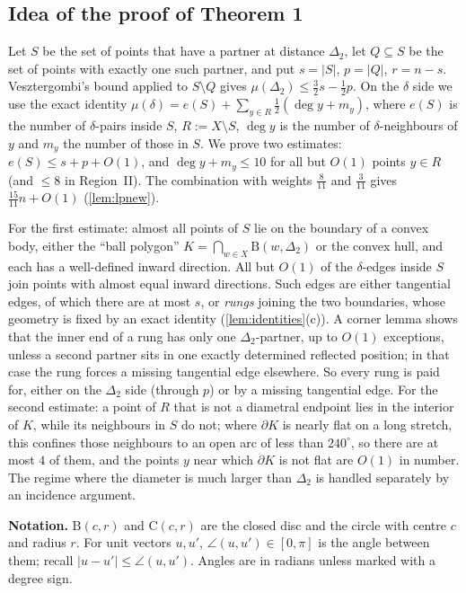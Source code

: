 \documentclass[11pt]{amsart}
\theoremstyle{definition}
\theoremstyle{remark}
\newcommand{\Dt}{\Delta_2}
\newcommand{\mult}{\mu}
\newcommand{\Cc}{\mathrm{C}}      %
\newcommand{\Dd}{\mathrm{B}}      %
\begin{document}
\subsection*{Idea of the proof of Theorem 1}
Let $S$ be the set of points that have a partner at distance $\Dt$, let $Q\subseteq S$ be the set of points with exactly one such partner, and put $s=|S|$, $p=|Q|$, $r=n-s$. Vesztergombi's bound applied to $S\setminus Q$ gives $\mult(\Dt)\le\frac32s-\frac12p$. On the $\delta$ side we use the exact identity $\mult(\delta)=e(S)+\sum_{y\in R}\frac12(\deg y+m_y)$, where $e(S)$ is the number of $\delta$-pairs inside $S$, $R:=X\setminus S$, $\deg y$ is the number of $\delta$-neighbours of $y$ and $m_y$ the number of those in $S$. We prove two estimates: $e(S)\le s+p+O(1)$, and $\deg y+m_y\le10$ for all but $O(1)$ points $y\in R$ (and $\le8$ in Region~II). The combination with weights $\frac8{11}$ and $\frac3{11}$ gives $\frac{15}{11}n+O(1)$ (\cref{lem:lpnew}).

For the first estimate: almost all points of $S$ lie on the boundary of a convex body, either the ``ball polygon'' $K=\bigcap_{w\in X}\Dd(w,\Dt)$ or the convex hull, and each has a well-defined inward direction. All but $O(1)$ of the $\delta$-edges inside $S$ join points with almost equal inward directions. Such edges are either tangential edges, of which there are at most $s$, or \emph{rungs} joining the two boundaries, whose geometry is fixed by an exact identity (\cref{lem:identities}(c)). A corner lemma shows that the inner end of a rung has only one $\Dt$-partner, up to $O(1)$ exceptions, unless a second partner sits in one exactly determined reflected position; in that case the rung forces a missing tangential edge elsewhere. So every rung is paid for, either on the $\Dt$ side (through $p$) or by a missing tangential edge. For the second estimate: a point of $R$ that is not a diametral endpoint lies in the interior of $K$, while its neighbours in $S$ do not; where $\partial K$ is nearly flat on a long stretch, this confines those neighbours to an open arc of less than $240^\circ$, so there are at most $4$ of them, and the points $y$ near which $\partial K$ is not flat are $O(1)$ in number. The regime where the diameter is much larger than $\Dt$ is handled separately by an incidence argument.

\medskip\noindent\textbf{Notation.} $\Dd(c,r)$ and $\Cc(c,r)$ are the closed disc and the circle with centre $c$ and radius $r$. For unit vectors $u,u'$, $\angle(u,u')\in[0,\pi]$ is the angle between them; recall $|u-u'|\le\angle(u,u')$. Angles are in radians unless marked with a degree sign.
\end{document}
